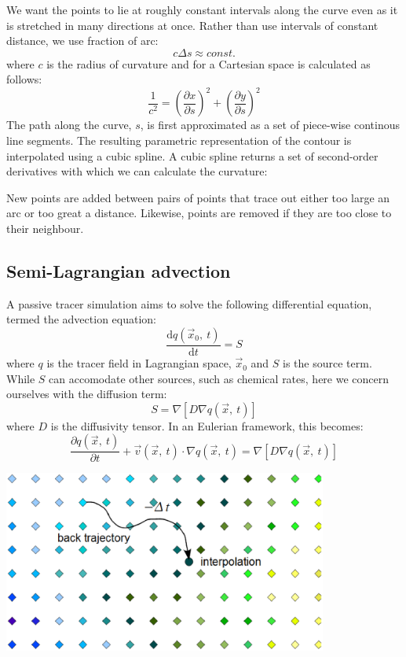 We want the points to lie at roughly constant intervals
along the curve even as it is stretched in many directions
at once.
Rather than use intervals of constant distance, we use fraction of arc:
\begin{equation}
c \Delta s \approx const.
\end{equation}
where $c$ is the radius of curvature and for a Cartesian
space is calculated as follows:
\begin{equation}
\frac{1}{c^2} = \left ( \frac{\partial x}{\partial s} \right )^2 +
		\left ( \frac{\partial y}{\partial s} \right )^2
\end{equation}
The path along the curve, $s$, is first approximated as a set of piece-wise
continous line segments.
The resulting parametric representation of the contour
is interpolated using a cubic spline.
A cubic spline returns a set of second-order
derivatives with which we can calculate the curvature:

New points are added between pairs of points that trace
out either too large an arc or too great a distance.
Likewise, points are removed if they are too close to their neighbour.

\subsection{Semi-Lagrangian advection}

A passive tracer simulation aims to solve the following
differential equation, termed the advection equation:
\begin{equation}
\frac{\mathrm d q(\vec x_0,~t)}{\mathrm d t}=S
\end{equation}
where $q$ is the tracer field in Lagrangian space, $\vec x_0$
and $S$ is the source term.
While $S$ can accomodate other sources,
such as chemical rates, here we concern ourselves with
the diffusion term:
\begin{equation}
S = \nabla \left [ D \nabla q(\vec x,~t) \right ]
\end{equation}
where $D$ is the diffusivity tensor.
In an Eulerian framework, this becomes:
\begin{equation}
\frac{\partial q(\vec x,~t)}{\partial t} + \vec v(\vec x,~t) \cdot \nabla q(\vec x,~t) = \nabla \left [ D \nabla q(\vec x,~t) \right ]
\end{equation}

\includegraphics[width=0.8\textwidth]{semi_Lagrangian.ps}

